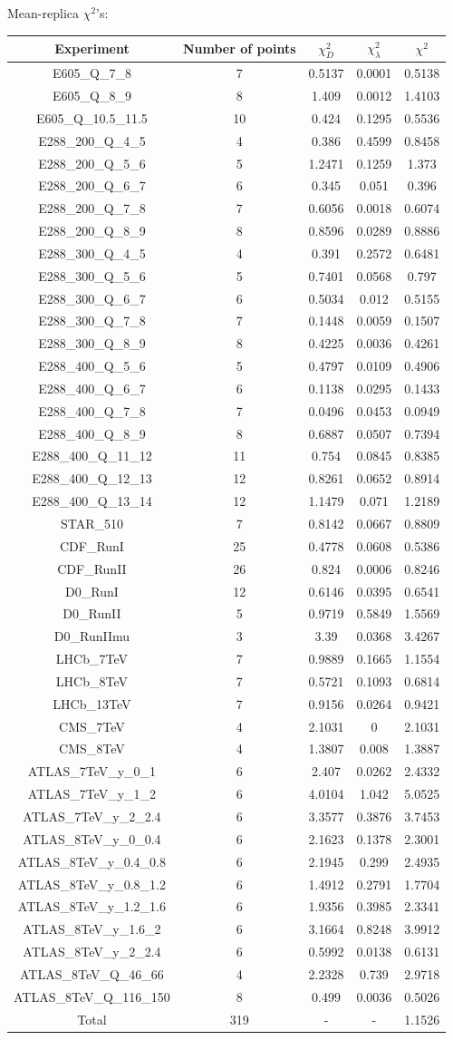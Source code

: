 \documentclass[
]{article}
\begin{document}
Mean-replica \(\chi^2\)'s:

\begin{longtable}[]{@{}ccccc@{}}
\toprule
Experiment & Number of points & \(\chi_{D}^2\) & \(\chi_{\lambda}^2\) &
\(\chi^2\)\tabularnewline
\midrule
\endhead
E605\_Q\_7\_8 & 7 & 0.5137 & 0.0001 & 0.5138\tabularnewline
E605\_Q\_8\_9 & 8 & 1.409 & 0.0012 & 1.4103\tabularnewline
E605\_Q\_10.5\_11.5 & 10 & 0.424 & 0.1295 & 0.5536\tabularnewline
E288\_200\_Q\_4\_5 & 4 & 0.386 & 0.4599 & 0.8458\tabularnewline
E288\_200\_Q\_5\_6 & 5 & 1.2471 & 0.1259 & 1.373\tabularnewline
E288\_200\_Q\_6\_7 & 6 & 0.345 & 0.051 & 0.396\tabularnewline
E288\_200\_Q\_7\_8 & 7 & 0.6056 & 0.0018 & 0.6074\tabularnewline
E288\_200\_Q\_8\_9 & 8 & 0.8596 & 0.0289 & 0.8886\tabularnewline
E288\_300\_Q\_4\_5 & 4 & 0.391 & 0.2572 & 0.6481\tabularnewline
E288\_300\_Q\_5\_6 & 5 & 0.7401 & 0.0568 & 0.797\tabularnewline
E288\_300\_Q\_6\_7 & 6 & 0.5034 & 0.012 & 0.5155\tabularnewline
E288\_300\_Q\_7\_8 & 7 & 0.1448 & 0.0059 & 0.1507\tabularnewline
E288\_300\_Q\_8\_9 & 8 & 0.4225 & 0.0036 & 0.4261\tabularnewline
E288\_400\_Q\_5\_6 & 5 & 0.4797 & 0.0109 & 0.4906\tabularnewline
E288\_400\_Q\_6\_7 & 6 & 0.1138 & 0.0295 & 0.1433\tabularnewline
E288\_400\_Q\_7\_8 & 7 & 0.0496 & 0.0453 & 0.0949\tabularnewline
E288\_400\_Q\_8\_9 & 8 & 0.6887 & 0.0507 & 0.7394\tabularnewline
E288\_400\_Q\_11\_12 & 11 & 0.754 & 0.0845 & 0.8385\tabularnewline
E288\_400\_Q\_12\_13 & 12 & 0.8261 & 0.0652 & 0.8914\tabularnewline
E288\_400\_Q\_13\_14 & 12 & 1.1479 & 0.071 & 1.2189\tabularnewline
STAR\_510 & 7 & 0.8142 & 0.0667 & 0.8809\tabularnewline
CDF\_RunI & 25 & 0.4778 & 0.0608 & 0.5386\tabularnewline
CDF\_RunII & 26 & 0.824 & 0.0006 & 0.8246\tabularnewline
D0\_RunI & 12 & 0.6146 & 0.0395 & 0.6541\tabularnewline
D0\_RunII & 5 & 0.9719 & 0.5849 & 1.5569\tabularnewline
D0\_RunIImu & 3 & 3.39 & 0.0368 & 3.4267\tabularnewline
LHCb\_7TeV & 7 & 0.9889 & 0.1665 & 1.1554\tabularnewline
LHCb\_8TeV & 7 & 0.5721 & 0.1093 & 0.6814\tabularnewline
LHCb\_13TeV & 7 & 0.9156 & 0.0264 & 0.9421\tabularnewline
CMS\_7TeV & 4 & 2.1031 & 0 & 2.1031\tabularnewline
CMS\_8TeV & 4 & 1.3807 & 0.008 & 1.3887\tabularnewline
ATLAS\_7TeV\_y\_0\_1 & 6 & 2.407 & 0.0262 & 2.4332\tabularnewline
ATLAS\_7TeV\_y\_1\_2 & 6 & 4.0104 & 1.042 & 5.0525\tabularnewline
ATLAS\_7TeV\_y\_2\_2.4 & 6 & 3.3577 & 0.3876 & 3.7453\tabularnewline
ATLAS\_8TeV\_y\_0\_0.4 & 6 & 2.1623 & 0.1378 & 2.3001\tabularnewline
ATLAS\_8TeV\_y\_0.4\_0.8 & 6 & 2.1945 & 0.299 & 2.4935\tabularnewline
ATLAS\_8TeV\_y\_0.8\_1.2 & 6 & 1.4912 & 0.2791 & 1.7704\tabularnewline
ATLAS\_8TeV\_y\_1.2\_1.6 & 6 & 1.9356 & 0.3985 & 2.3341\tabularnewline
ATLAS\_8TeV\_y\_1.6\_2 & 6 & 3.1664 & 0.8248 & 3.9912\tabularnewline
ATLAS\_8TeV\_y\_2\_2.4 & 6 & 0.5992 & 0.0138 & 0.6131\tabularnewline
ATLAS\_8TeV\_Q\_46\_66 & 4 & 2.2328 & 0.739 & 2.9718\tabularnewline
ATLAS\_8TeV\_Q\_116\_150 & 8 & 0.499 & 0.0036 & 0.5026\tabularnewline
Total & 319 & - & - & 1.1526\tabularnewline
\bottomrule
\end{longtable}
\end{document}
